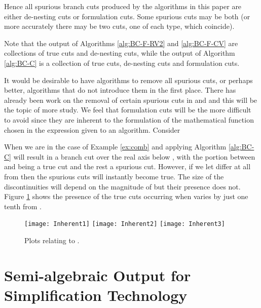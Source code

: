 \documentclass{llncs}
\begin{document}
Hence all spurious branch cuts produced by the algorithms in this paper are either de-nesting cuts or formulation cuts.  Some spurious cuts may be both (or more accurately there may be two cuts, one of each type, which coincide).

Note that the output of Algorithms \ref{alg:BC-F-RV2} and \ref{alg:BC-F-CV} are collections of true cuts and de-nesting cuts, while the output of Algorithm \ref{alg:BC-C} is a collection of true cuts, de-nesting cuts and formulation cuts. 

It would be desirable to have algorithms to remove all spurious cuts, or perhaps better, algorithms that do not introduce them in the first place.  There has already been work on the removal of certain spurious cuts in \cite{DF94} and \cite[etc.]{Phisanbut11} and this will be the topic of more study.  We feel that formulation cuts will be the more difficult to avoid since they are inherent to the formulation of the mathematical function chosen in the expression given to an algorithm.  Consider 

When  we are in the case of Example \ref{ex:comb} and applying Algorithm \ref{alg:BC-C} will result in a branch cut over the real axis below , with the portion between  and  being a true cut and the rest a spurious cut.  However, if we let  differ at all from  then the spurious cuts will instantly become true.  The size of the discontinuities will depend on the magnitude of  but their presence does not.  Figure \ref{fig:Inherent} shows the presence of the true cuts occurring when  varies by just one tenth from .  

\begin{figure}[ht] 
\begin{center}
\texttt{[image: Inherent1]}
\hspace*{0.3cm}
\texttt{[image: Inherent2]}
\hspace*{0.3cm}
\texttt{[image: Inherent3]}
\end{center}
\caption{Plots relating to .} 
\label{fig:Inherent}
\end{figure}



\section{Semi-algebraic Output for Simplification Technology} \label{SEC:SA}
\end{document}
